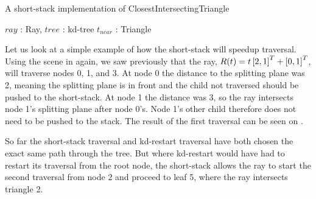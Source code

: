 \begin{algorithm}
  \caption{A short-stack implementation of ClosestIntersectingTriangle}
  \label{alg:ShortStack}
  \begin{algorithmic}
              {$ray$ : Ray, $tree$ : kd-tree}
              {$t_{near}$ : Triangle}{
      \ELSE
      \ENDIF
          \ENDIF
        \ELSE
        \ENDIF
      \ENDWHILE
      \ELSE
      \ENDIF
    \ENDWHILE
              }
  \end{algorithmic}
\end{algorithm}


Let us look at a simple example of how the short-stack will speedup
traversal. Using the scene in  again, we saw
previously that the ray, $R(t) = t \left[2, 1 \right]^T + \left[0, 1 \right]^T$, will
traverse nodes 0, 1, and 3. At node 0 the distance to the splitting plane was 2,
meaning the splitting plane is in front and the child not traversed should be
pushed to the short-stack. At node 1 the distance was 3, so the ray intersects
node 1's splitting plane after node 0's. Node 1's other child therefore does not
need to be pushed to the stack. The result of the first traversal can be seen on
.

So far the short-stack traversal and kd-restart traversal have both chosen the
exact same path through the tree. But where kd-restart would have had to restart
its traversal from the root node, the short-stack allows the ray to start the
second traversal from node 2 and proceed to leaf 5, where the ray intersects
triangle 2.

